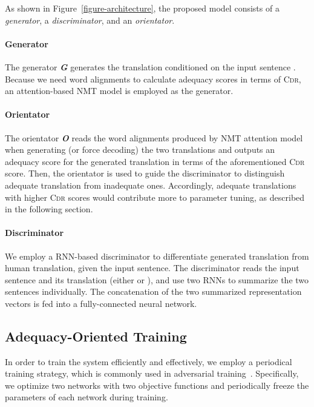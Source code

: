 \documentclass[letterpaper]{article} \usepackage{aaai19}  \usepackage{times}  \usepackage{helvet}  \usepackage{courier}  \usepackage{url}  \usepackage{graphicx}  \frenchspacing  \setlength{\pdfpagewidth}{8.5in}  \setlength{\pdfpageheight}{11in}  \usepackage{amsmath}
\begin{document}
As shown in Figure~\ref{figure-architecture}, the proposed model consists of a {\em generator}, a {\em discriminator}, and an {\em orientator}.

\paragraph{Generator} The generator {\bf \em G} generates the translation  conditioned on the input sentence . Because we need word alignments to calculate adequacy  scores in terms of \textsc{Cdr}, an attention-based NMT model is employed as the generator.


\paragraph{Orientator} The orientator {\bf \em O} reads the word alignments produced by NMT attention model when generating (or force decoding) the two translations and outputs an adequacy score for the generated translation in terms of the aforementioned \textsc{Cdr} score. Then, the orientator is used to guide the discriminator to distinguish adequate translation from inadequate ones. Accordingly, adequate translations with higher \textsc{Cdr} scores would contribute more to parameter tuning, as described in the following section.

\paragraph{Discriminator} We employ a RNN-based discriminator to differentiate generated translation from human translation, given the input sentence. The discriminator reads the input sentence  and its translation (either  or ), and use two RNNs to summarize the two sentences individually. The concatenation of the two summarized representation vectors is fed into a fully-connected neural network.












\subsection{Adequacy-Oriented Training}

In order to train the system efficiently and effectively, we employ a periodical training strategy, which is commonly used in adversarial training~\cite{goodfellow2014generative,wu2017adversarial}. Specifically, we optimize two networks with two objective functions and periodically freeze the parameters of each network during training.
\end{document}
